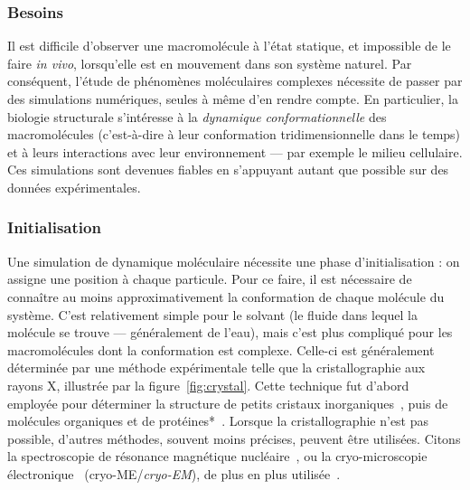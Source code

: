 	\subsubsection{Besoins} Il est difficile d'observer une macromolécule à l'état statique, et impossible de le faire \emph{in vivo}, lorsqu'elle est en mouvement dans son système naturel. Par conséquent, l'étude de phénomènes moléculaires complexes nécessite de passer par des simulations numériques, seules à même d'en rendre compte. En particulier, la biologie structurale s'intéresse à la \emph{dynamique conformationnelle} des macromolécules (c'est-à-dire à leur conformation tridimensionnelle dans le temps) et à leurs interactions avec leur environnement --- par exemple le milieu cellulaire. Ces simulations sont devenues fiables en s'appuyant autant que possible sur des données expérimentales.
	
	\subsubsection{Initialisation}
	Une simulation de dynamique moléculaire nécessite une phase d'initialisation : on assigne une position à chaque particule. Pour ce faire, il est nécessaire de connaître au moins approximativement la conformation de chaque molécule du système. C'est relativement simple pour le solvant (le fluide dans lequel la molécule se trouve --- généralement de l'eau), mais c'est plus compliqué pour les macromolécules dont la conformation est complexe. Celle-ci est généralement déterminée par une méthode expérimentale telle que la cristallographie aux rayons X, illustrée par la figure~\ref{fig:crystal}. Cette technique fut d'abord employée pour déterminer la structure de petits cristaux inorganiques~\cite{friedrich1912sitzungsberichte, bragg1914reflexion, bragg1913structure, dickinson1923crystal}, puis de molécules organiques et de protéines*~\cite{de1925interpretation, crowfoot1935x, kendrew1958three}\footnotemark{}. Lorsque la cristallographie n'est pas possible, d'autres méthodes, souvent moins précises, peuvent être utilisées. Citons la spectroscopie de résonance magnétique nucléaire~\cite{clore1989determination, wuthrich1990protein, clore1991structures, wuthrich2001way}, ou la cryo-microscopie électronique~\cite{adrian1984cryo} (cryo-ME/\emph{cryo-EM}), de plus en plus utilisée~\cite{kuhlbrandt2014cryo, callaway2015revolution, dellisanti2015barrier, bartesaghi20152}.

	
